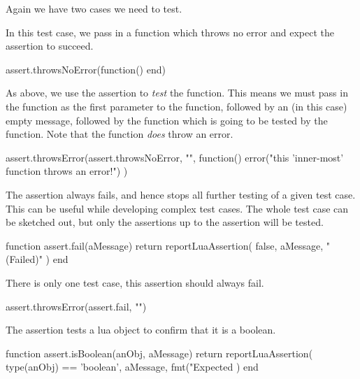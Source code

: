 Again we have two cases we need to test.


In this test case, we pass in a function which throws no error and expect 
the assertion to succeed. 

\startLuaTest
  assert.throwsNoError(function() end)
\stopLuaTest
\stopTestCase


As above, we use the  assertion to \emph{test} 
the  function. This means we must pass in the 
 function as the first parameter to the 
  function, followed by an (in this 
case) empty message, followed by the function which is going to be tested 
by the  function. Note that the 
 function \emph{does} throw an error. 

\startLuaTest
  assert.throwsError(assert.throwsNoError, "", function()
    error("this 'inner-most' function throws an error!")
  )
\stopLuaTest
\stopTestCase

\stopTestSuite


The  assertion always fails, and hence stops all further 
testing of a given test case. This can be useful while developing complex 
test cases. The whole test case can be sketched out, but only the 
assertions up to the  assertion will be tested. 

\startLuaCode
function assert.fail(aMessage)
  return reportLuaAssertion(
    false,
    aMessage,
    "(Failed)"
  )
end
\stopLuaCode


There is only one test case, this assertion should always fail.

\startLuaTest
  assert.throwsError(assert.fail, "")
\stopLuaTest
\stopTestCase

\stopTestSuite


The  assertion tests a lua object to confirm that 
it is a boolean. 

\startLuaCode
function assert.isBoolean(anObj, aMessage)
  return reportLuaAssertion(
    type(anObj) == 'boolean',
    aMessage,
    fmt("Expected %
  )
end
\stopLuaCode

